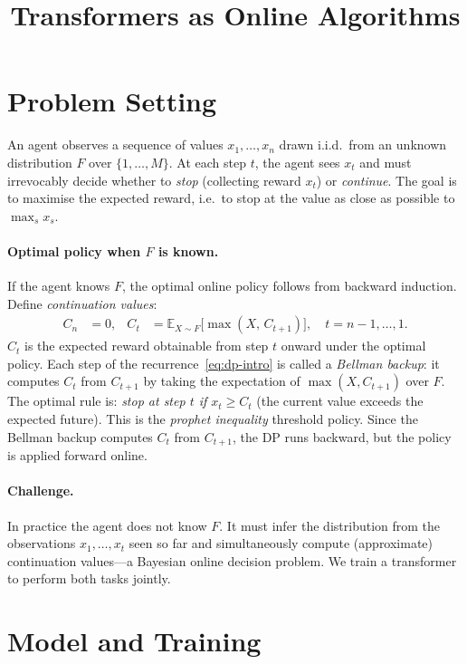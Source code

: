 \documentclass{article}
\title{Transformers as Online Algorithms}
\begin{document}
\maketitle

\section{Problem Setting}
\label{sec:problem}

An agent observes a sequence of values $x_1, \ldots, x_n$ drawn i.i.d.\ from an unknown distribution $F$ over $\{1, \ldots, M\}$. At each step $t$, the agent sees $x_t$ and must irrevocably decide whether to \emph{stop} (collecting reward $x_t$) or \emph{continue}. The goal is to maximise the expected reward, i.e.\ to stop at the value as close as possible to $\max_s x_s$.

\paragraph{Optimal policy when $F$ is known.}
If the agent knows $F$, the optimal online policy follows from backward induction. Define \emph{continuation values}:
\begin{align}
C_n &= 0, & C_t &= \mathbb{E}_{X \sim F}\!\big[\max(X,\, C_{t+1})\big], \quad t = n{-}1, \ldots, 1. \label{eq:dp-intro}
\end{align}
$C_t$ is the expected reward obtainable from step $t$ onward under the optimal policy. Each step of the recurrence~\eqref{eq:dp-intro} is called a \emph{Bellman backup}: it computes $C_t$ from $C_{t+1}$ by taking the expectation of $\max(X, C_{t+1})$ over $F$. The optimal rule is: \emph{stop at step $t$ if $x_t \ge C_t$} (the current value exceeds the expected future). This is the \emph{prophet inequality} threshold policy. Since the Bellman backup computes $C_t$ from $C_{t+1}$, the DP runs backward, but the policy is applied forward online.

\paragraph{Challenge.}
In practice the agent does not know $F$. It must infer the distribution from the observations $x_1, \ldots, x_t$ seen so far and simultaneously compute (approximate) continuation values---a Bayesian online decision problem. We train a transformer to perform both tasks jointly.

\section{Model and Training}
\label{sec:model}
\end{document}
